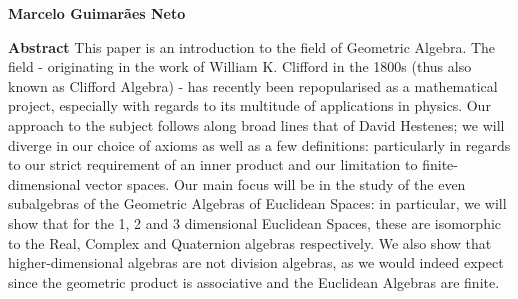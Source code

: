 \thispagestyle{plain}
\begin{center}
	\Large
	\textbf{\thtitle}
	    
	\vspace{0.4cm}
	\large
	\thsubtitle
	
	\vspace{0.4cm}
	\textbf{Marcelo Guimarães Neto}
	   
	\vspace{0.9cm}
	\textbf{Abstract}
		This paper is an introduction to the field of Geometric Algebra. The field - originating in the work of William K. Clifford in the 1800s (thus also known as Clifford Algebra) - has recently been repopularised as a mathematical project, especially with regards to its multitude of applications in physics. Our approach to the subject follows along broad lines that of David Hestenes; we will diverge in our choice of axioms as well as a few definitions: particularly in regards to our strict requirement of an inner product and our limitation to finite-dimensional vector spaces. Our main focus will be in the study of the even subalgebras of the Geometric Algebras of Euclidean Spaces: in particular, we will show that for the 1, 2 and 3 dimensional Euclidean Spaces, these are isomorphic to the Real, Complex and Quaternion algebras respectively. We also show that higher-dimensional algebras are not division algebras, as we would indeed expect since the geometric product is associative and the Euclidean Algebras are finite.
\end{center}
